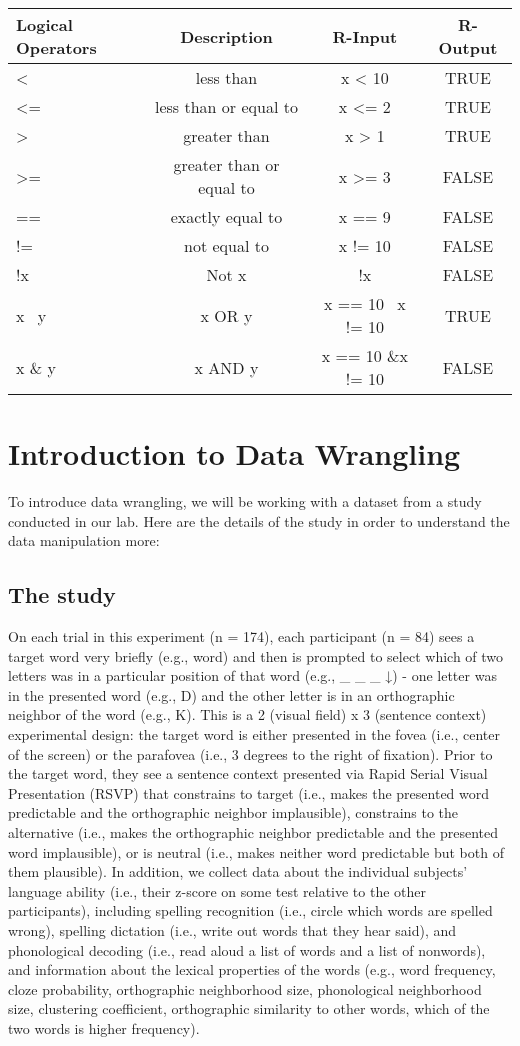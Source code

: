 \documentclass[]{book}
\begin{document}
\begin{longtable}[]{@{}lccc@{}}
\toprule
Logical Operators & Description & R-Input & R-Output\tabularnewline
\midrule
\endhead
\textless{} & less than & x \textless{} 10 & TRUE\tabularnewline
\textless{}= & less than or equal to & x \textless{}= 2 &
TRUE\tabularnewline
\textgreater{} & greater than & x \textgreater{} 1 & TRUE\tabularnewline
\textgreater{}= & greater than or equal to & x \textgreater{}= 3 &
FALSE\tabularnewline
== & exactly equal to & x == 9 & FALSE\tabularnewline
!= & not equal to & x != 10 & FALSE\tabularnewline
!x & Not x & !x & FALSE\tabularnewline
x \textbar{}~y & x OR y & x == 10 \textbar{}~x != 10 &
TRUE\tabularnewline
x \& y & x AND y & x == 10 \&x != 10 & FALSE\tabularnewline
\bottomrule
\end{longtable}

\chapter{Introduction to Data
Wrangling}\label{introduction-to-data-wrangling}

To introduce data wrangling, we will be working with a dataset from a
study conducted in our lab. Here are the details of the study in order
to understand the data manipulation more:

\section{The study}\label{the-study}

On each trial in this experiment (n = 174), each participant (n = 84)
sees a target word very briefly (e.g., word) and then is prompted to
select which of two letters was in a particular position of that word
(e.g., \_ \_ \_ ↓) - one letter was in the presented word (e.g., D) and
the other letter is in an orthographic neighbor of the word (e.g., K).
This is a 2 (visual field) x 3 (sentence context) experimental design:
the target word is either presented in the fovea (i.e., center of the
screen) or the parafovea (i.e., 3 degrees to the right of fixation).
Prior to the target word, they see a sentence context presented via
Rapid Serial Visual Presentation (RSVP) that constrains to target (i.e.,
makes the presented word predictable and the orthographic neighbor
implausible), constrains to the alternative (i.e., makes the
orthographic neighbor predictable and the presented word implausible),
or is neutral (i.e., makes neither word predictable but both of them
plausible). In addition, we collect data about the individual subjects'
language ability (i.e., their z-score on some test relative to the other
participants), including spelling recognition (i.e., circle which words
are spelled wrong), spelling dictation (i.e., write out words that they
hear said), and phonological decoding (i.e., read aloud a list of words
and a list of nonwords), and information about the lexical properties of
the words (e.g., word frequency, cloze probability, orthographic
neighborhood size, phonological neighborhood size, clustering
coefficient, orthographic similarity to other words, which of the two
words is higher frequency).
\end{document}
